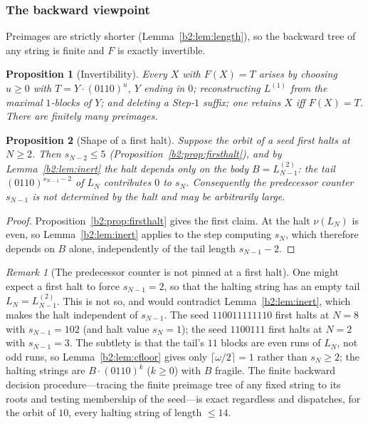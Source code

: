 \documentclass[a4paper]{article}
\theoremstyle{plain}
\newtheorem{proposition}{Proposition}[subsection]
\theoremstyle{definition}
\theoremstyle{remark}
\newtheorem{remark}{Remark}[subsection]
\begin{document}
\subsubsection{The backward viewpoint}\label{b2:sec:backward}
Preimages are strictly shorter (Lemma~\ref{b2:lem:length}), so the backward tree of any string is finite and $F$ is exactly invertible.

\begin{proposition}[Invertibility]\label{b2:prop:inv}
Every $X$ with $F(X)=T$ arises by choosing $u\ge 0$ with $T=Y\cdot(0110)^u$, $Y$ ending in $0$; reconstructing $L^{(1)}$ from the maximal $1$-blocks of $Y$; and deleting a Step-$1$ suffix; one retains $X$ iff $F(X)=T$. There are finitely many preimages.
\end{proposition}

\begin{proposition}[Shape of a first halt]\label{b2:prop:halt-shape}
Suppose the orbit of a seed first halts at $N\ge 2$. Then $s_{N-2}\le 5$ (Proposition~\ref{b2:prop:firsthalt}), and by Lemma~\ref{b2:lem:inert} the halt depends only on the body $B=L^{(2)}_{N-1}$: the tail $(0110)^{s_{N-1}-2}$ of $L_N$ contributes $0$ to $s_N$. Consequently the predecessor counter $s_{N-1}$ is not determined by the halt and may be arbitrarily large.
\end{proposition}
\begin{proof}
Proposition~\ref{b2:prop:firsthalt} gives the first claim. At the halt $\nu(L_N)$ is even, so Lemma~\ref{b2:lem:inert} applies to the step computing $s_N$, which therefore depends on $B$ alone, independently of the tail length $s_{N-1}-2$.
\end{proof}

\begin{remark}[The predecessor counter is not pinned at a first halt]\label{b2:rem:rem31}
One might expect a first halt to force $s_{N-1}=2$, so that the halting string has an empty tail $L_N=L^{(2)}_{N-1}$. This is not so, and would contradict Lemma~\ref{b2:lem:inert}, which makes the halt independent of $s_{N-1}$. The seed $110011111110$ first halts at $N=8$ with $s_{N-1}=102$ (and halt value $s_N=1$); the seed $1100111$ first halts at $N=2$ with $s_{N-1}=3$. The subtlety is that the tail's $11$ blocks are even runs of $L_N$, not odd runs, so Lemma~\ref{b2:lem:cfloor} gives only $\lceil\omega/2\rceil=1$ rather than $s_N\ge 2$; the halting strings are $B\cdot(0110)^k$ ($k\ge 0$) with $B$ fragile. The finite backward decision procedure---tracing the finite preimage tree of any fixed string to its roots and testing membership of the seed---is exact regardless and dispatches, for the orbit of $10$, every halting string of length $\le 14$.
\end{remark}
\end{document}

